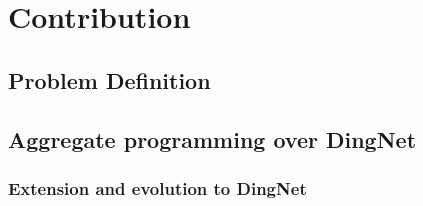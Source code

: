 \chapter{Contribution}
\label{chap:contribution}

\section{Problem Definition} %




\section{Aggregate programming over DingNet}

\subsection{Extension and evolution to DingNet}


